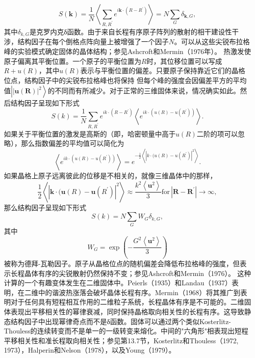 \begin{equation}\tag{10.7.21}\label{eq:10.7.21}
S ( \pmb { k } ) = \frac { 1 } { N } \left\langle \sum _ { R , R ^{\prime} } e ^{i \pmb { k} \cdot ( R - R ^{\prime} ) } \right\rangle = N \sum _ { G } \delta _ { \pmb { k } , G } ,
\end{equation}
其中\(\delta_{k,G}\)是克罗内克δ函数。由于来自长程有序原子阵列的散射的相干建设性干涉，结构因子在每个倒格点阵向量上被增强了一个因子\(N\)。可以从这些尖锐布拉格峰的实验模式确定固体的晶体结构；参见Ashcroft和Mermin（1976年）。
热激发使原子偏离其平衡位置。一个原子的平衡位置为\(R\)时，其位移位置可以写成\(R + u(R)\)，其中\(u(R)\)表示与平衡位置的偏差。只要原子保持靠近它们的晶格位点，结构因子中的尖锐布拉格峰也将保持
但每个峰的强度会因偏差平方的平均值\(\left|\left|\boldsymbol{u}(\boldsymbol{R})\right|^{2}\right\rangle\)的不同而有所减少。对于正常的三维固体来说，情况确实如此。然后结构因子呈现如下形式
\begin{equation}\tag{10.7.22}\label{eq:10.7.22}
S ( k ) = \frac { 1 } { N } \sum _ { R , R ^{\prime} } e ^{i k \cdot ( R - R ^ { \prime} ) } \left\langle e ^{i k \cdot ( u ( R ) - u ( R ^ { \prime} ) ) } \right\rangle .
\end{equation}
如果关于平衡位置的激发是高斯的（即，哈密顿量中高于\(u(R)\)二阶的项可以忽略），那么指数偏差的平均值可以简化为
\begin{equation}\tag{10.7.23}\label{eq:10.7.23}
\left\langle e ^{i k \cdot ( u ( R ) - u ( R ^ { \prime} ) ) } \right\rangle = e ^{- \frac { 1} { 2 } \left\langle \left| k \cdot ( u ( R ) - u ( R ^{\prime} ) \right| ^{2} \right\rangle } .
\end{equation}
如果晶格上原子远离彼此的位移是不相关的，就像三维晶体中的那样，
\begin{equation}\tag{10.7.24}\label{eq:10.7.24}
\frac { 1 } { 2 } \left\langle | \pmb { k } \cdot ( \pmb { u } ( R ) - \pmb { u } ( R ^{\prime} ) | ^{2} \right\rangle \approx \frac { k ^{2} \left\langle \pmb { u } ^{2} \right\rangle } { 3 }  \mathrm { f o r } \, | \pmb { R } - \pmb { R } ^{\prime} | \rightarrow \infty ,
\end{equation}
那么结构因子呈现如下形式
\begin{equation}\tag{10.7.25}\label{eq:10.7.25}
S ( k ) = N \sum _ { G } W _ { G } \delta _ { k , G } ,
\end{equation}
其中
\begin{equation}\tag{10.7.26}\label{eq:10.7.26}
W _ { G } = \exp \left( - \frac { G ^{2} \left\langle \boldsymbol { u } ^{2} \right\rangle } { 3 } \right)
\end{equation}
被称为德拜-瓦勒因子。原子从晶格位点的随机偏差会降低布拉格峰的强度，但表示长程晶体有序的尖锐散射仍然保持不变；参见Ashcroft和Mermin（1976）。
这种计算的一个有趣变体发生在二维固体中。Peierls（1935）和Landau（1937）表明，在二维中的谐波热涨落会破坏晶体长程有序。Mermin（1968）将其推广到表明对于任何具有短程相互作用的二维粒子系统，长程晶体有序是不可能的。二维固体表现出平移相关性的幂律衰减，同时保持晶格取向相关性的长程有序。这导致静态结构因子中出现幂律奇点而不是δ函数。固体可以通过两个类似Kosterlitz-Thouless的连续转变而不是单一的一级转变来熔化。中间的"六角形"相表现出短程平移相关性和准长程取向相关性；参见第13.7节，Kosterlitz和Thouless（1972, 1973），Halperin和Nelson（1978），以及Young（1979）。
